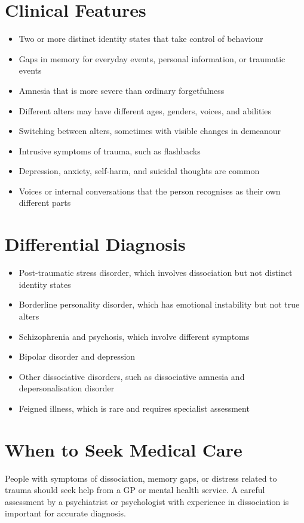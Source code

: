 \section*{Clinical Features}
\begin{itemize}
    \item Two or more distinct identity states that take control of behaviour
    \item Gaps in memory for everyday events, personal information, or traumatic events
    \item Amnesia that is more severe than ordinary forgetfulness
    \item Different alters may have different ages, genders, voices, and abilities
    \item Switching between alters, sometimes with visible changes in demeanour
    \item Intrusive symptoms of trauma, such as flashbacks
    \item Depression, anxiety, self-harm, and suicidal thoughts are common
    \item Voices or internal conversations that the person recognises as their own different parts
\end{itemize}

\section*{Differential Diagnosis}
\begin{itemize}
    \item Post-traumatic stress disorder, which involves dissociation but not distinct identity states
    \item Borderline personality disorder, which has emotional instability but not true alters
    \item Schizophrenia and psychosis, which involve different symptoms
    \item Bipolar disorder and depression
    \item Other dissociative disorders, such as dissociative amnesia and depersonalisation disorder
    \item Feigned illness, which is rare and requires specialist assessment
\end{itemize}

\section*{When to Seek Medical Care}
People with symptoms of dissociation, memory gaps, or distress related to trauma should seek help from a GP or mental health service. A careful assessment by a psychiatrist or psychologist with experience in dissociation is important for accurate diagnosis.

